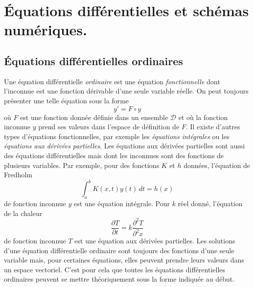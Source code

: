 

\section{\'Equations différentielles et schémas numériques.}
\subsection{\'Equations différentielles ordinaires}
Une équation différentielle \emph{ordinaire} est une équation \emph{fonctionnelle} dont l'inconnue est une fonction dérivable d'une seule variable réelle. On peut toujours présenter une telle équation sous la forme
\begin{equation}
  y' = F\circ y
  \label{gene}
\end{equation}
où $F$ est une fonction donnée définie dans un ensemble $\mathcal{D}$ et où la fonction inconnue $y$ prend ses valeurs dans l'espace de définition de $F$.\newline
Il existe d'autres types d'équations fonctionnelles, par exemple les \emph{équations intégrales} ou les \emph{équations aux dérivées partielles}. Les équations aux dérivées partielles sont aussi des équations différentielles mais dont les inconnues sont des fonctions de plusieurs variables.\newline
Par exemple, pour des fonctions $K$ et $h$ données, l'équation de Fredholm
\begin{equation}
  \int_{a}^{b}K(x,t)y(t)\,dt = h(x)
  \label{fredholm}
\end{equation}
de fonction inconnue $y$ est une équation intégrale.\newline
Pour $k$ réel donné, l'équation de la chaleur
\begin{displaymath}
  \frac{\partial T}{\partial t} = k\frac{\partial^2 T}{\partial^2 x}
  \label{chaleur}
\end{displaymath}
de fonction inconnue $T$ est une équation aux dérivées partielles.\newline
Les solutions d'une équation différentielle ordinaire sont toujours des fonctions d'une seule variable mais, pour certaines équations, elles peuvent prendre leurs valeurs dans un espace vectoriel. C'est pour cela que toutes les équations différentielles ordinaires peuvent se mettre théoriquement sous la forme indiquée au début.\newline
